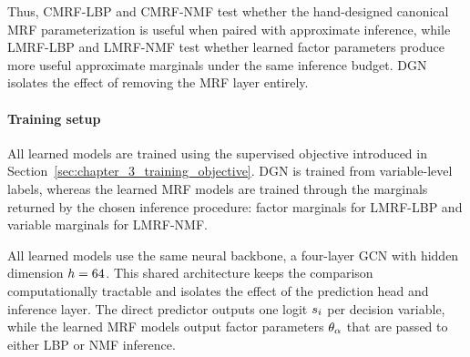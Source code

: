 \begin{table}[t]
\centering
{}
\caption{Summary of the prediction methods compared in the experiments. The column ``Trained'' indicates whether the method contains trainable neural parameters; CMRF parameters depend on the problem instance but are fixed by the canonical construction.}
\label{tab:chapter_3_compared_methods}
\end{table}

Thus, CMRF-LBP and CMRF-NMF test whether the hand-designed canonical MRF parameterization is useful when paired with approximate inference, while LMRF-LBP and LMRF-NMF test whether learned factor parameters produce more useful approximate marginals under the same inference budget. DGN isolates the effect of removing the MRF layer entirely.

\paragraph{Training setup} 
All learned models are trained using the supervised objective introduced in Section~\ref{sec:chapter_3_training_objective}. DGN is trained from variable-level labels, whereas the learned MRF models are trained through the marginals returned by the chosen inference procedure: factor marginals for LMRF-LBP and variable marginals for LMRF-NMF.

All learned models use the same neural backbone, a four-layer GCN \citep{kipf_semi-supervised_2017} with hidden dimension $h=64$. This shared architecture keeps the comparison computationally tractable and isolates the effect of the prediction head and inference layer. The direct predictor outputs one logit $s_i$ per decision variable, while the learned MRF models output factor parameters $\theta_{\alpha}$ that are passed to either LBP or NMF inference.

